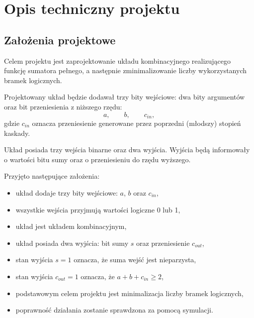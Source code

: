 %   

\section{Opis techniczny projektu}

\subsection{Założenia projektowe}

Celem projektu jest zaprojektowanie układu kombinacyjnego realizującego funkcję sumatora pełnego, a następnie zminimalizowanie liczby wykorzystanych bramek logicznych.

Projektowany układ będzie dodawał trzy bity wejściowe: dwa bity argumentów oraz bit przeniesienia z niższego rzędu:
\begin{equation*}
a, \qquad b, \qquad c_{in},
\end{equation*}
gdzie $c_{in}$ oznacza przeniesienie generowane przez poprzedni (młodszy) stopień kaskady.

Układ posiada trzy wejścia binarne oraz dwa wyjścia. Wyjścia będą informowały o wartości bitu sumy oraz o przeniesieniu do rzędu wyższego.

Przyjęto następujące założenia:
\begin{itemize}
    \item układ dodaje trzy bity wejściowe: $a$, $b$ oraz $c_{in}$,
    \item wszystkie wejścia przyjmują wartości logiczne 0 lub 1,
    \item układ jest układem kombinacyjnym,
    \item układ posiada dwa wyjścia: bit sumy $s$ oraz przeniesienie $c_{out}$,
    \item stan wyjścia $s = 1$ oznacza, że suma wejść jest nieparzysta,
    \item stan wyjścia $c_{out} = 1$ oznacza, że $a + b + c_{in} \geq 2$,
    \item podstawowym celem projektu jest minimalizacja liczby bramek logicznych,
    \item poprawność działania zostanie sprawdzona za pomocą symulacji.
\end{itemize}

